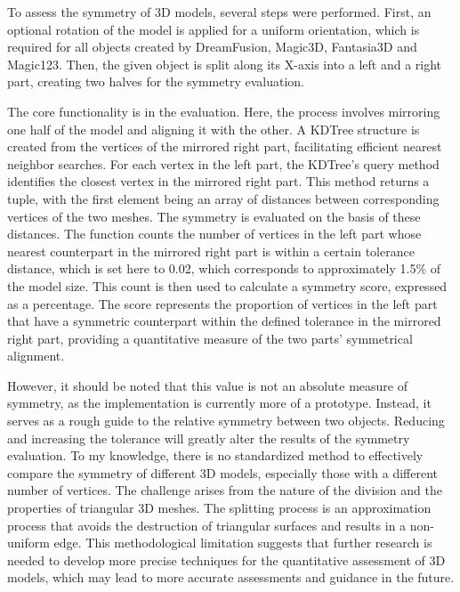 To assess the symmetry of 3D models, several steps were performed. First, an optional rotation of the model is applied for a uniform orientation, which is required for all objects created by DreamFusion, Magic3D, Fantasia3D and Magic123. Then, the given object is split along its X-axis into a left and a right part, creating two halves for the symmetry evaluation.

The core functionality is in the evaluation. Here, the process involves mirroring one half of the model and aligning it with the other. A KDTree structure is created from the vertices of the mirrored right part, facilitating efficient nearest neighbor searches. For each vertex in the left part, the KDTree's query method identifies the closest vertex in the mirrored right part. This method returns a tuple, with the first element being an array of distances between corresponding vertices of the two meshes. The symmetry is evaluated on the basis of these distances. The function counts the number of vertices in the left part whose nearest counterpart in the mirrored right part is within a certain tolerance distance, which is set here to 0.02, which corresponds to approximately 1.5\% of the model size. This count is then used to calculate a symmetry score, expressed as a percentage. The score represents the proportion of vertices in the left part that have a symmetric counterpart within the defined tolerance in the mirrored right part, providing a quantitative measure of the two parts' symmetrical alignment.

However, it should be noted that this value is not an absolute measure of symmetry, as the implementation is currently more of a prototype. Instead, it serves as a rough guide to the relative symmetry between two objects. Reducing and increasing the tolerance will greatly alter the results of the symmetry evaluation. To my knowledge, there is no standardized method to effectively compare the symmetry of different 3D models, especially those with a different number of vertices. The challenge arises from the nature of the division and the properties of triangular 3D meshes. The splitting process is an approximation process that avoids the destruction of triangular surfaces and results in a non-uniform edge. This methodological limitation suggests that further research is needed to develop more precise techniques for the quantitative assessment of 3D models, which may lead to more accurate assessments and guidance in the future.

